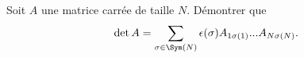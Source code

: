 
\begin{exercice}\label{exoSerieCinq0002}

Soit $A$ une matrice carrée de taille $N$. Démontrer que 
\begin{equation}
	\det A=\sum_{\sigma\in\Sym(N)} \epsilon(\sigma)A_{1\sigma(1)}...A_{N\sigma(N)}.
\end{equation}

\end{exercice}
